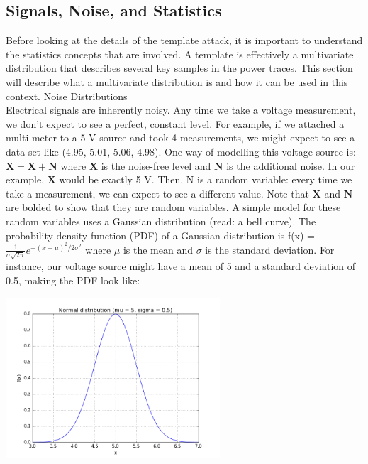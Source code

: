     \subsection{Signals, Noise, and Statistics}
    Before looking at the details of the template attack, it is important to
    understand the statistics concepts that are involved. A template is
    effectively a multivariate distribution that describes several key samples
    in the power traces. This section will describe what a multivariate
    distribution is and how it can be used in this context. Noise
    Distributions\\
    Electrical signals are inherently noisy. Any time we take a voltage
    measurement, we don't expect to see a perfect, constant level. For example,
    if we attached a multi-meter to a 5 V source and took 4 measurements, we
    might expect to see a data set like (4.95, 5.01, 5.06, 4.98). One way of
    modelling this voltage source is: $\mathbf{X} = \mathbf{X} + \mathbf{N}$
    where $\mathbf{X}$ is the noise-free level and $\mathbf{N}$ is the
    additional noise. In our example, $\mathbf{X}$ would be exactly 5 V. Then, N
    is a random variable: every time we take a measurement, we can expect to see
    a different value. Note that $\mathbf{X}$ and $\mathbf{N}$ are bolded to
    show that they are random variables. A simple model for these random
    variables uses a Gaussian distribution (read: a bell curve). The probability
    density function (PDF) of a Gaussian distribution is f(x) = $
    \frac{1}{\sigma \sqrt{2\pi}} e^{-(x - \mu)^2 / 2\sigma^2}$ where
    $\displaystyle \mu$  is the mean and  $ \sigma$ is the standard deviation.
    For instance, our voltage source might have a mean of 5 and a standard
    deviation of 0.5, making the PDF look like:\\
    \begin{minipage}{\linewidth}
    \centering
    \includegraphics[width=8cm]{images/Lecture_5/Normal-Dist.png}
    \end{minipage}
